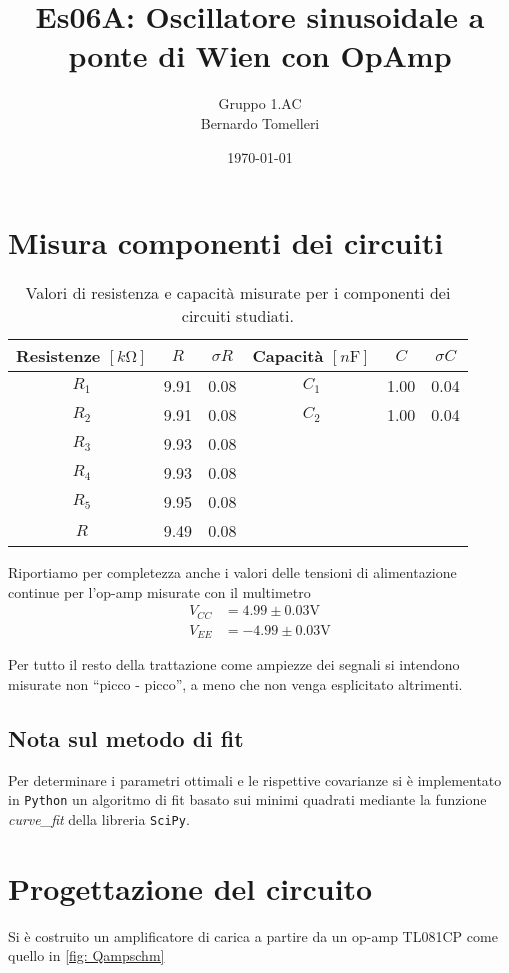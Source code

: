 \documentclass[10pt, a4paper, italian]{article}
\author{Gruppo 1.AC \\ Bernardo Tomelleri}
\title{Es06A: Oscillatore sinusoidale a ponte di Wien con OpAmp}
\begin{document}
\date{\today}
\maketitle

\setcounter{section}{0}

\section*{Misura componenti dei circuiti}
\begin{table}[htbp]
\centering
\begin{tabular}{cccccc}
\toprule
Resistenze $[\si{k\ohm}]$ & $R$ & $\sigma R$ & Capacità $[\si{n\F}]$ & $C$ &
$\sigma C$ \\
\midrule
\midrule
$R_1$	  & 9.91	& 0.08	 & $C_1$ & 1.00		 & 0.04 \\
$R_2$	  & 9.91	& 0.08 	 & $C_2$ & 1.00		 & 0.04 \\
$R_3$	  & 9.93	& 0.08	 & & & \\
$R_4$	  & 9.93	& 0.08	 & & & \\
$R_5$	  & 9.95	& 0.08	 & & & \\
$R$		  & 9.49	& 0.08	 & & & \\
\bottomrule     
\end{tabular}
\caption{Valori di resistenza e capacità misurate per i componenti dei
circuiti studiati. \label{tab: rcmes}}
\end{table}

Riportiamo per completezza anche i valori delle tensioni di alimentazione
continue per l'op-amp misurate con il multimetro
\begin{align*}
V_{CC} &= 4.99 \pm 0.03 \si{\V} \\
V_{EE} &= -4.99 \pm 0.03 \si{\V}
\end{align*}

Per tutto il resto della trattazione come ampiezze dei segnali si intendono
misurate non ``picco - picco'', a meno che non venga esplicitato altrimenti.

\subsection*{Nota sul metodo di fit}
Per determinare i parametri ottimali e le rispettive covarianze si \`e
implementato in \verb+Python+ un algoritmo di fit basato sui minimi quadrati
mediante la funzione \emph{curve\_fit} della libreria \texttt{SciPy}.

\section{Progettazione del circuito}
Si è costruito un amplificatore di carica a partire da un op-amp TL081CP come
quello in \cref{fig: Qampschm}
\end{document}
